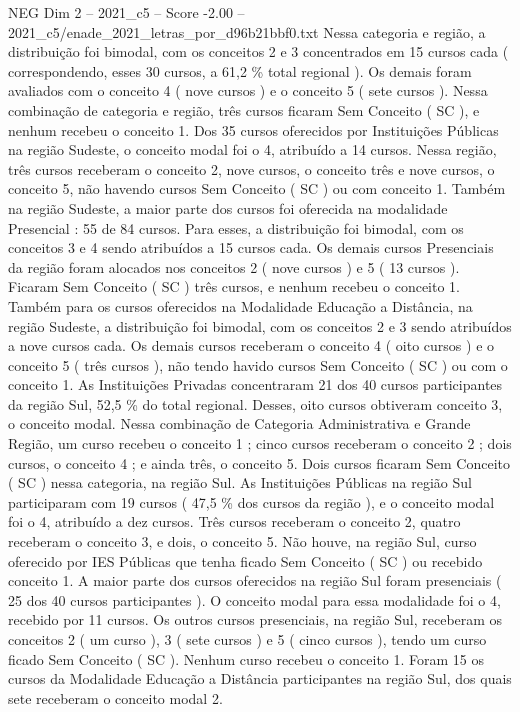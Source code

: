 \begin{textsample}{NEG Dim 2 – 2021\_c5 – Score -2.00 – 2021\_c5/enade\_2021\_letras\_por\_d96b21bbf0.txt}
Nessa categoria e região, a distribuição foi bimodal, com os conceitos 2 e 3 concentrados em 15 cursos cada ( correspondendo, esses 30 cursos, a 61,2 \% total regional ).
Os demais foram avaliados com o conceito 4 ( nove cursos ) e o conceito 5 ( sete cursos ).
Nessa combinação de categoria e região, três cursos ficaram Sem Conceito ( SC ), e nenhum recebeu o conceito 1.
Dos 35 cursos oferecidos por Instituições Públicas na região Sudeste, o conceito modal foi o 4, atribuído a 14 cursos.
Nessa região, três cursos receberam o conceito 2, nove cursos, o conceito três e nove cursos, o conceito 5, não havendo cursos Sem Conceito ( SC ) ou com conceito 1.
Também na região Sudeste, a maior parte dos cursos foi oferecida na modalidade Presencial : 55 de 84 cursos.
Para esses, a distribuição foi bimodal, com os conceitos 3 e 4 sendo atribuídos a 15 cursos cada.
Os demais cursos Presenciais da região foram alocados nos conceitos 2 ( nove cursos ) e 5 ( 13 cursos ).
Ficaram Sem Conceito ( SC ) três cursos, e nenhum recebeu o conceito 1.
Também para os cursos oferecidos na Modalidade Educação a Distância, na região Sudeste, a distribuição foi bimodal, com os conceitos 2 e 3 sendo atribuídos a nove cursos cada.
Os demais cursos receberam o conceito 4 ( oito cursos ) e o conceito 5 ( três cursos ), não tendo havido cursos Sem Conceito ( SC ) ou com o conceito 1.
As Instituições Privadas concentraram 21 dos 40 cursos participantes da região Sul, 52,5 \% do total regional.
Desses, oito cursos obtiveram conceito 3, o conceito modal.
Nessa combinação de Categoria Administrativa e Grande Região, um curso recebeu o conceito 1 ; cinco cursos receberam o conceito 2 ; dois cursos, o conceito 4 ; e ainda três, o conceito 5.
Dois cursos ficaram Sem Conceito ( SC ) nessa categoria, na região Sul.
As Instituições Públicas na região Sul participaram com 19 cursos ( 47,5 \% dos cursos da região ), e o conceito modal foi o 4, atribuído a dez cursos.
Três cursos receberam o conceito 2, quatro receberam o conceito 3, e dois, o conceito 5.
Não houve, na região Sul, curso oferecido por IES Públicas que tenha ficado Sem Conceito ( SC ) ou recebido conceito 1.
A maior parte dos cursos oferecidos na região Sul foram presenciais ( 25 dos 40 cursos participantes ).
O conceito modal para essa modalidade foi o 4, recebido por 11 cursos.
Os outros cursos presenciais, na região Sul, receberam os conceitos 2 ( um curso ), 3 ( sete cursos ) e 5 ( cinco cursos ), tendo um curso ficado Sem Conceito ( SC ).
Nenhum curso recebeu o conceito 1.
Foram 15 os cursos da Modalidade Educação a Distância participantes na região Sul, dos quais sete receberam o conceito modal 2.

\end{textsample}
